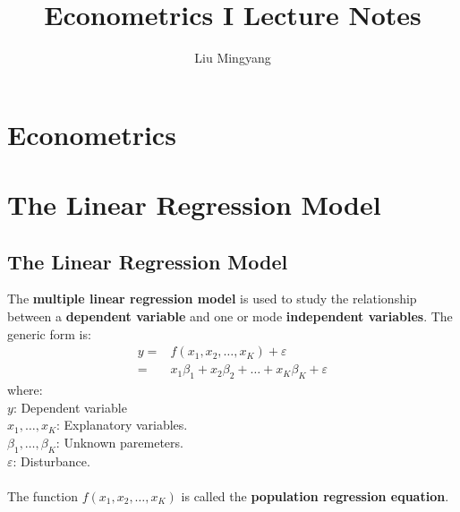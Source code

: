 \documentclass{article}
\title{Econometrics I Lecture Notes}
\author{Liu Mingyang}
\begin{document}
\onehalfspacing
\maketitle
\tableofcontents

\newpage
\section{Econometrics}
\section{The Linear Regression Model}
\subsection{The Linear Regression Model}
The \textbf{multiple linear regression model} is used to study the relationship between a \textbf{dependent variable} and one or mode \textbf{independent variables}. The generic form is:
	\begin{align*}
		y = &f(x_1, x_2, \ldots, x_K) + \varepsilon\\
		= &x_1\beta_1 + x_2\beta_2 + \ldots + x_K\beta_K + \varepsilon
	\end{align*}
where:\\
\indent $y$: Dependent variable\\
\indent $x_1, \ldots, x_K$: Explanatory variables.\\
\indent $\beta_1, \ldots, \beta_K$: Unknown paremeters.\\
\indent $\varepsilon$: Disturbance.\\\\
The function $f(x_1, x_2, \ldots, x_K)$ is called the \textbf{population regression equation}.
\end{document}
